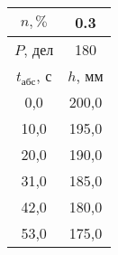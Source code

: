 \begin{tabular}[t]{|c|c|}
\hline
$n, \%$ & 0.3 \\
\hline
$P$, дел & 180 \\
\hline
$t_{абс}$, с & $h$, мм \\ 
\hline
0,0 & 200,0 \\ 
10,0 & 195,0 \\ 
20,0 & 190,0 \\ 
31,0 & 185,0 \\ 
42,0 & 180,0 \\ 
53,0 & 175,0 \\ 
\hline
\end{tabular}